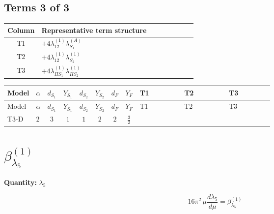 \documentclass[8pt]{article}
\begin{document}
\begin{landscape}
\subsection*{Terms 3 of 3}
\begin{center}
\begin{tabular}{@{}c >{\raggedright\arraybackslash}p{0.82\linewidth}@{}}
\toprule
Column & Representative term structure \\
\midrule
T1 & \(\displaystyle +4 {\lambda_{12}^{(1)}} {\lambda_{S_1}^{(A)}}\) \\
\midrule
T2 & \(\displaystyle +4 {\lambda_{12}^{(1)}} {\lambda_{S_2}^{(1)}}\) \\
\midrule
T3 & \(\displaystyle +4 {\lambda_{HS_1}^{(1)}} {\lambda_{HS_2}^{(1)}}\) \\
\midrule
\bottomrule
\end{tabular}
\end{center}
\smallskip
\tiny
\begin{longtable}{@{}llcccccc >{\raggedright\arraybackslash}p{0.21\linewidth} >{\raggedright\arraybackslash}p{0.21\linewidth} >{\raggedright\arraybackslash}p{0.21\linewidth}@{}}
\toprule
Model & $\alpha$ & $d_{S_1}$ & $Y_{S_1}$ & $d_{S_2}$ & $Y_{S_2}$ & $d_F$ & $Y_F$ & T1 & T2 & T3 \\
\midrule
\endfirsthead
\toprule
Model & $\alpha$ & $d_{S_1}$ & $Y_{S_1}$ & $d_{S_2}$ & $Y_{S_2}$ & $d_F$ & $Y_F$ & T1 & T2 & T3 \\
\midrule
\endhead
T3-D & $2$ & $3$ & $1$ & $1$ & $2$ & $2$ & $\frac{3}{2}$ & \scriptsize\adjustbox{max width=\linewidth}{$\begin{gathered} +4 {\lambda_{12}^{(1)}} {\lambda_{S_1}^{(A)}}\end{gathered}$} & \scriptsize\adjustbox{max width=\linewidth}{$\begin{gathered} +4 {\lambda_{12}^{(1)}} {\lambda_{S_2}^{(1)}}\end{gathered}$} & \scriptsize\adjustbox{max width=\linewidth}{$\begin{gathered} +4 {\lambda_{HS_1}^{(1)}} {\lambda_{HS_2}^{(1)}}\end{gathered}$} \\
\midrule
\bottomrule
\end{longtable}
\clearpage
\section*{$\beta_{\lambda_5}^{(1)}$}
\noindent\textbf{Quantity: }$\lambda_5$\par\smallskip
\[16\pi^2\,\mu\frac{d \lambda_5}{d\mu}=\beta_{\lambda_5}^{(1)}\]

\end{landscape}
\end{document}
